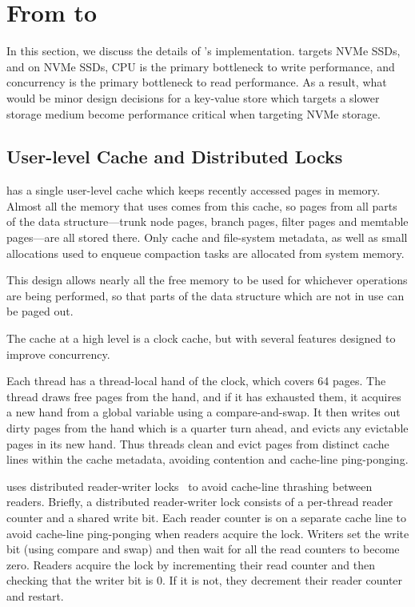 \section{From \datastructs to \sysname}\label{sec:details} 
In this section, we discuss the details of \sysname's implementation. \sysname
targets NVMe SSDs, and on NVMe SSDs, CPU is the primary bottleneck to
write performance, and concurrency is the primary bottleneck to read
performance. As a result, what would be minor design decisions for a key-value
store which targets a slower storage medium become performance critical when
targeting NVMe storage.

\subsection{User-level Cache and Distributed Locks}\label{sec:cache}

\sysname{} has a single user-level cache which keeps recently accessed pages in
memory. Almost all the memory that \sysname uses comes from this cache, so
pages from all parts of the data structure---trunk node pages, branch pages,
filter pages and memtable pages---are all stored there. Only cache and
file-system metadata, as well as small allocations used to enqueue compaction
tasks are allocated from system memory.

This design allows nearly all the free memory to be used for whichever
operations are being performed, so that parts of the data structure which are
not in use can be paged out.

The cache at a high level is a clock cache, but with several features designed
to improve concurrency.

Each thread has a thread-local hand of the clock, which covers 64 pages. The
thread draws free pages from the hand, and if it has exhausted them, it
acquires a new hand from a global variable using a compare-and-swap. It then
writes out dirty pages from the hand which is a quarter turn ahead, and
evicts any evictable pages in its new hand. Thus threads clean and evict pages
from distinct cache lines within the cache metadata, avoiding contention and
cache-line ping-ponging.

\sysname uses distributed reader-writer locks~\cite{HsiehWe92} to
avoid cache-line thrashing between readers.  Briefly, a distributed
reader-writer lock consists of a per-thread reader counter and a
shared write bit.  Each reader counter is on a separate cache line to
avoid cache-line ping-ponging when readers acquire the lock.  Writers
set the write bit (using compare and swap) and then wait for all the
read counters to become zero.  Readers acquire the lock by
incrementing their read counter and then checking that the writer bit
is 0.  If it is not, they decrement their reader counter and restart.

